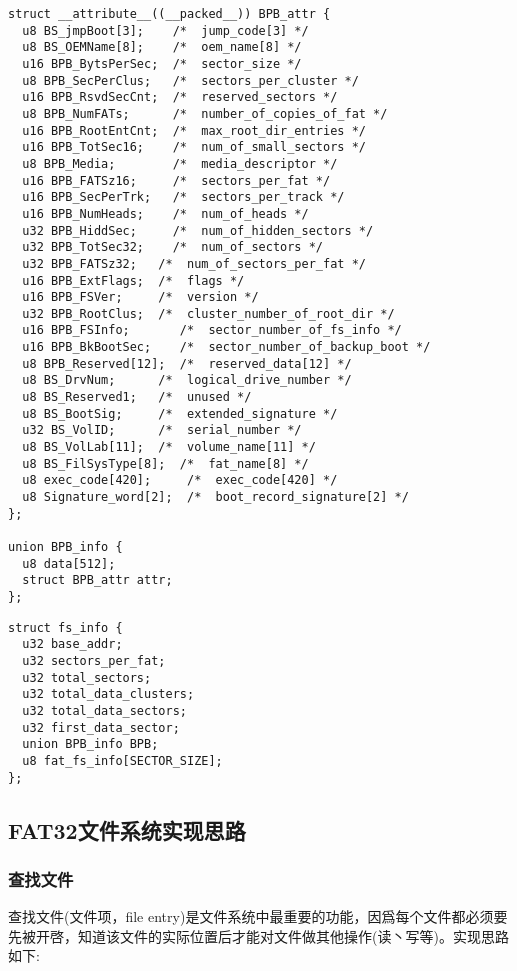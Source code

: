 \begin{lstlisting}[caption=FAT分区的BPB结构]
struct __attribute__((__packed__)) BPB_attr {
  u8 BS_jmpBoot[3];    /*  jump_code[3] */
  u8 BS_OEMName[8];    /*  oem_name[8] */
  u16 BPB_BytsPerSec;  /*  sector_size */
  u8 BPB_SecPerClus;   /*  sectors_per_cluster */
  u16 BPB_RsvdSecCnt;  /*  reserved_sectors */
  u8 BPB_NumFATs;      /*  number_of_copies_of_fat */
  u16 BPB_RootEntCnt;  /*  max_root_dir_entries */
  u16 BPB_TotSec16;    /*  num_of_small_sectors */
  u8 BPB_Media;        /*  media_descriptor */
  u16 BPB_FATSz16;     /*  sectors_per_fat */
  u16 BPB_SecPerTrk;   /*  sectors_per_track */
  u16 BPB_NumHeads;    /*  num_of_heads */
  u32 BPB_HiddSec;     /*  num_of_hidden_sectors */
  u32 BPB_TotSec32;    /*  num_of_sectors */
  u32 BPB_FATSz32;   /*  num_of_sectors_per_fat */
  u16 BPB_ExtFlags;  /*  flags */
  u16 BPB_FSVer;     /*  version */
  u32 BPB_RootClus;  /*  cluster_number_of_root_dir */
  u16 BPB_FSInfo;       /*  sector_number_of_fs_info */
  u16 BPB_BkBootSec;    /*  sector_number_of_backup_boot */
  u8 BPB_Reserved[12];  /*  reserved_data[12] */
  u8 BS_DrvNum;      /*  logical_drive_number */
  u8 BS_Reserved1;   /*  unused */
  u8 BS_BootSig;     /*  extended_signature */
  u32 BS_VolID;      /*  serial_number */
  u8 BS_VolLab[11];  /*  volume_name[11] */
  u8 BS_FilSysType[8];  /*  fat_name[8] */
  u8 exec_code[420];     /*  exec_code[420] */
  u8 Signature_word[2];  /*  boot_record_signature[2] */
};

union BPB_info {
  u8 data[512];
  struct BPB_attr attr;
};
\end{lstlisting}


\begin{lstlisting}[caption=FAT信息]
struct fs_info {
  u32 base_addr;
  u32 sectors_per_fat;
  u32 total_sectors;
  u32 total_data_clusters;
  u32 total_data_sectors;
  u32 first_data_sector;
  union BPB_info BPB;
  u8 fat_fs_info[SECTOR_SIZE];
};
\end{lstlisting}


\subsection{FAT32文件系统实现思路}



\subsubsection{查找文件}

查找文件(文件项，file entry)是文件系统中最重要的功能，因爲每个文件都必须要先被开啓，知道该文件的实际位置后才能对文件做其他操作(读丶写等)。实现思路如下: 


